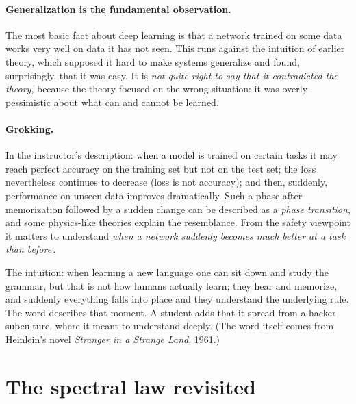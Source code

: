 \paragraph{Generalization is the fundamental observation.}
The most basic fact about deep learning is that a network trained on some data works very well on data it has not seen. This runs against the intuition of earlier theory, which supposed it hard to make systems generalize and found, surprisingly, that it was easy. It is \emph{not quite right to say that it contradicted the theory},
because the theory focused on the wrong situation: it was overly pessimistic about what can and cannot be learned.

\paragraph{Grokking.}
In the instructor's description: when a model is trained on certain tasks it may reach perfect accuracy on the training set but not on the test set; the loss nevertheless continues to decrease (loss is not accuracy); and then, suddenly, performance on unseen data improves dramatically. Such a phase after memorization followed by a sudden change can be described as a \emph{phase transition},
and some physics-like theories explain the resemblance. From the safety viewpoint it matters to understand \emph{when a network suddenly becomes much better at a task than before}\,\citep{power2022}.

\begin{discussion}
The intuition: when learning a new language one can sit down and study the grammar, but that is not how humans actually learn; they hear and memorize, and suddenly everything falls into place and they understand the underlying rule. The word describes that moment. A student adds that it spread from a hacker subculture, where it meant to understand deeply.\dagmark{} (The word itself comes from Heinlein's novel \emph{Stranger in a Strange Land}, 1961.)
\end{discussion}

\section{The spectral law revisited}\label{sec:L3-recap}

